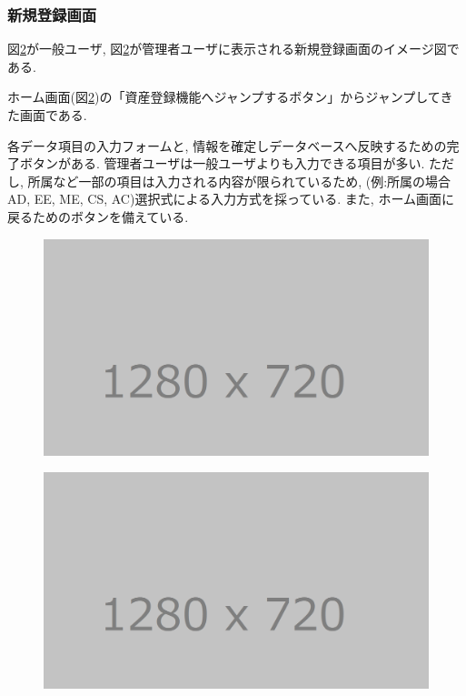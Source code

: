 \documentclass[11ptm]{jsarticle}
\begin{document}
\subsubsection{新規登録画面}
\label{sec:新規登録画面}
図\ref{fig:}が一般ユーザ, 図\ref{fig:}が管理者ユーザに表示される新規登録画面のイメージ図である. \par
ホーム画面(図\ref{fig:})の「資産登録機能へジャンプするボタン」からジャンプしてきた画面である. \par
各データ項目の入力フォームと, 情報を確定しデータベースへ反映するための完了ボタンがある. 管理者ユーザは一般ユーザよりも入力できる項目が多い. ただし, 所属など一部の項目は入力される内容が限られているため, (例:所属の場合AD, EE, ME, CS, AC)選択式による入力方式を採っている. また, ホーム画面に戻るためのボタンを備えている.
\begin{figure}[h]
  \centering
  \includegraphics[keepaspectratio, width=0.8\linewidth]{source/tmp_picture.png}
  \caption{\label{fig:}}
\end{figure}
\begin{figure}[h]
  \centering
  \includegraphics[keepaspectratio, width=0.8\linewidth]{source/tmp_picture.png}
  \caption{\label{fig:}}
\end{figure}

\clearpage
\end{document}

